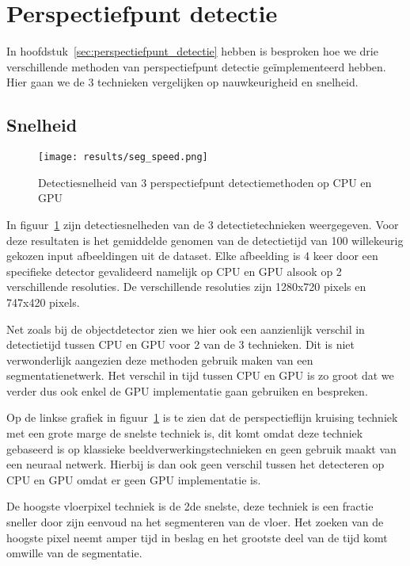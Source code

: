 \section{Perspectiefpunt detectie}

In hoofdstuk~\ref{sec:perspectiefpunt_detectie} hebben is besproken hoe we drie verschillende methoden van perspectiefpunt detectie ge\"{i}mplementeerd hebben.
Hier gaan we de 3 technieken vergelijken op nauwkeurigheid en snelheid.


\subsection{Snelheid}\label{sec:seg_speed}
\begin{figure}[h]
    \texttt{[image: results/seg\_speed.png]}
    \caption{Detectiesnelheid van 3 perspectiefpunt detectiemethoden op CPU en GPU}
    \label{fig:seg_speed}
\end{figure}

In figuur~\ref{fig:seg_speed} zijn detectiesnelheden van de 3 detectietechnieken weergegeven.
Voor deze resultaten is het gemiddelde genomen van de detectietijd van 100 willekeurig gekozen input afbeeldingen uit de dataset.
Elke afbeelding is 4 keer door een specifieke detector gevalideerd namelijk op \gls{CPU} en \gls{GPU} alsook op 2 verschillende resoluties.
De verschillende resoluties zijn 1280x720 pixels en 747x420 pixels.

Net zoals bij de objectdetector zien we hier ook een aanzienlijk verschil in detectietijd tussen \gls{CPU} en \gls{GPU} voor 2 van de 3 technieken.
Dit is niet verwonderlijk aangezien deze methoden gebruik maken van een segmentatienetwerk.
Het verschil in tijd tussen \gls{CPU} en \gls{GPU} is zo groot dat we verder dus ook enkel de \gls{GPU} implementatie gaan gebruiken en bespreken.

Op de linkse grafiek in figuur~\ref{fig:seg_speed} is te zien dat de perspectieflijn kruising techniek met een grote marge de snelste techniek is, dit komt
omdat deze techniek gebaseerd is op klassieke beeldverwerkingstechnieken en geen gebruik maakt van een neuraal netwerk.
Hierbij is dan ook geen verschil tussen het detecteren op \gls{CPU} en \gls{GPU} omdat er geen \gls{GPU} implementatie is.

De hoogste vloerpixel techniek is de 2de snelste, deze techniek is een fractie sneller door zijn eenvoud na het segmenteren van de vloer.
Het zoeken van de hoogste pixel neemt amper tijd in beslag en het grootste deel van de tijd komt omwille van de segmentatie.

